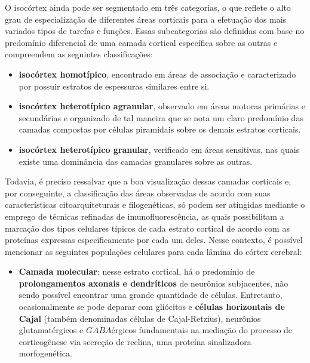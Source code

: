\documentclass[
]{book}
\providecommand{\tightlist}{%
  \setlength{\itemsep}{0pt}\setlength{\parskip}{0pt}}
\theoremstyle{definition}
\theoremstyle{definition}
\theoremstyle{definition}
\theoremstyle{definition}
\theoremstyle{remark}
\begin{document}
O isocórtex ainda pode ser segmentado em três categorias, o que reflete o alto grau de especialização de diferentes áreas corticais para a efetuação dos mais variados tipos de tarefas e funções. Essas subcategorias são definidas com base no predomínio diferencial de uma camada cortical específica sobre as outras e compreendem as seguintes classificações:

\begin{itemize}
\tightlist
\item
  \textbf{isocórtex homotípico}, encontrado em áreas de associação e caracterizado por possuir estratos de espessuras similares entre si.
\item
  \textbf{isocórtex heterotípico agranular}, observado em áreas motoras primárias e secundárias e organizado de tal maneira que se nota um claro predomínio das camadas compostas por células piramidais sobre os demais estratos corticais.
\item
  \textbf{isocórtex heterotípico granular}, verificado em áreas sensitivas, nas quais existe uma dominância das camadas granulares sobre as outras.
\end{itemize}

Todavia, é preciso ressalvar que a boa visualização dessas camadas corticais e, por conseguinte, a classificação das áreas observadas de acordo com suas características citoarquiteturais e filogenéticas, só podem ser atingidas mediante o emprego de técnicas refinadas de imunofluorescência, as quais possibilitam a marcação dos tipos celulares típicos de cada estrato cortical de acordo com as proteínas expressas especificamente por cada um deles. Nesse contexto, é possível mencionar as seguintes populações celulares para cada lâmina do córtex cerebral:

\begin{itemize}
\tightlist
\item
  \textbf{Camada molecular}: nesse estrato cortical, há o predomínio de \textbf{prolongamentos axonais e dendríticos} de neurônios subjacentes, não sendo possível encontrar uma grande quantidade de células. Entretanto, ocasionalmente se pode deparar com gliócitos e \textbf{células horizontais de Cajal} (também denominadas células de Cajal-Retzius), neurônios glutamatérgicos e \(GABA\)érgicos fundamentais na mediação do processo de corticogênese via secreção de reelina, uma proteína sinalizadora morfogenética.
\end{itemize}
\end{document}
